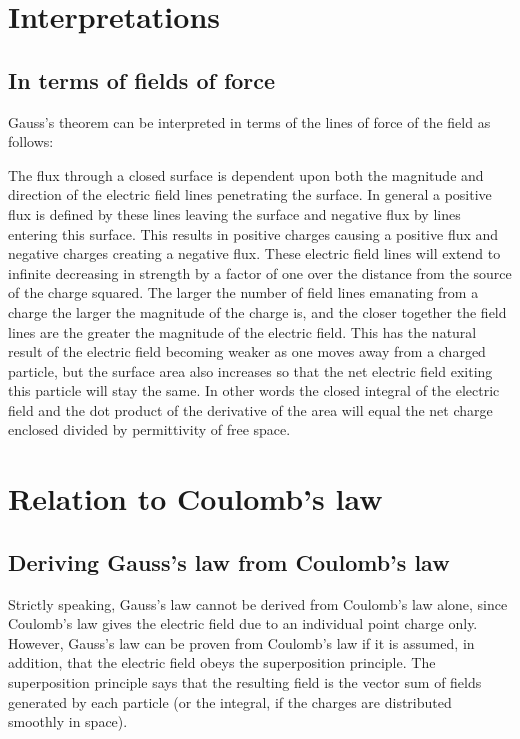 \documentclass[a4paper]{article}
\begin{document}
\section{Interpretations}
\subsection{In terms of fields of force}
Gauss's theorem can be interpreted in terms of the lines of force of the field as follows:

The flux through a closed surface is dependent upon both the magnitude and direction of the electric field lines penetrating the surface. In general a positive flux is defined by these lines leaving the surface and negative flux by lines entering this surface. This results in positive charges causing a positive flux and negative charges creating a negative flux. These electric field lines will extend to infinite decreasing in strength by a factor of one over the distance from the source of the charge squared. The larger the number of field lines emanating from a charge the larger the magnitude of the charge is, and the closer together the field lines are the greater the magnitude of the electric field. This has the natural result of the electric field becoming weaker as one moves away from a charged particle, but the surface area also increases so that the net electric field exiting this particle will stay the same. In other words the closed integral of the electric field and the dot product of the derivative of the area will equal the net charge enclosed divided by permittivity of free space. 

\section{Relation to Coulomb's law}
\subsection{Deriving Gauss's law from Coulomb's law}
Strictly speaking, Gauss's law cannot be derived from Coulomb's law alone, since Coulomb's law gives the electric field due to an individual point charge only. However, Gauss's law can be proven from Coulomb's law if it is assumed, in addition, that the electric field obeys the superposition principle. The superposition principle says that the resulting field is the vector sum of fields generated by each particle (or the integral, if the charges are distributed smoothly in space). 
\end{document}

